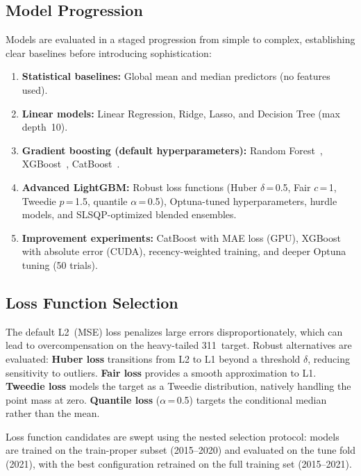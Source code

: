 \documentclass[sigconf,nonacm]{acmart}
\begin{document}
\subsection{Model Progression}

Models are evaluated in a staged progression from simple to
complex, establishing clear baselines before introducing
sophistication:

\begin{enumerate}[leftmargin=*,nosep]
\item \textbf{Statistical baselines:} Global mean and median
      predictors (no features used).
\item \textbf{Linear models:} Linear Regression, Ridge,
      Lasso, and Decision Tree (max depth~10).
\item \textbf{Gradient boosting (default hyperparameters):}
      Random Forest~\cite{breiman2001random},
      XGBoost~\cite{chen2016xgboost},
      CatBoost~\cite{prokhorenkova2018catboost}.
\item \textbf{Advanced LightGBM:} Robust loss functions
      (Huber $\delta$\,=\,0.5, Fair $c$\,=\,1, Tweedie
      $p$\,=\,1.5, quantile $\alpha$\,=\,0.5), Optuna-tuned
      hyperparameters, hurdle models, and SLSQP-optimized
      blended ensembles.
\item \textbf{Improvement experiments:} CatBoost with MAE loss
      (GPU), XGBoost with absolute error (CUDA), recency-weighted
      training, and deeper Optuna tuning (50 trials).
\end{enumerate}

\subsection{Loss Function Selection}

The default L2~(MSE) loss penalizes large errors
disproportionately, which can lead to overcompensation on the
heavy-tailed 311~target. Robust alternatives are evaluated:
\textbf{Huber loss} transitions from L2 to L1 beyond a threshold
$\delta$, reducing sensitivity to outliers.
\textbf{Fair loss} provides a smooth approximation to L1.
\textbf{Tweedie loss} models the target as a Tweedie distribution,
natively handling the point mass at zero.
\textbf{Quantile loss} ($\alpha$\,=\,0.5) targets the conditional
median rather than the mean.

Loss function candidates are swept using the nested selection
protocol: models are trained on the train-proper subset
(2015--2020) and evaluated on the tune fold (2021), with the best
configuration retrained on the full training set (2015--2021).
\end{document}
